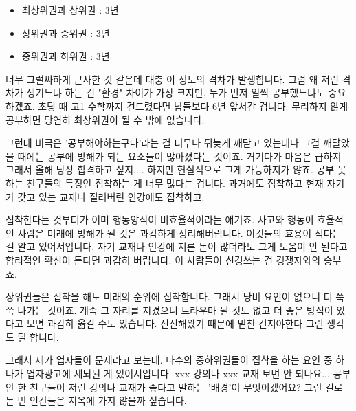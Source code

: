 \vspace{5mm}
\begin{itemize}
    \item 최상위권과 상위권 : 3년
    \item 상위권과  중위권 : 3년
    \item 중위권과  하위권 : 3년
\end{itemize}
\vspace{5mm}

너무 그럴싸하게 근사한 것 같은데 대충 이 정도의 격차가 발생합니다.
그럼 왜 저런 격차가 생기느냐 하는 건 "환경" 차이가 가장 크지만, 누가 먼저 일찍 공부했느냐도 중요하겠죠.
초딩 때 고1 수학까지 건드렸다면 남들보다 6년 앞서간 겁니다. 무리하지 않게 공부하면 당연히 최상위권이 될 수 밖에 없습니다.
\vspace{5mm}

그런데 비극은 '공부해야하는구나'라는 걸 너무나 뒤늦게 깨닫고 있는데다
그걸 깨달았을 때에는 공부에 방해가 되는 요소들이 많아졌다는 것이죠.
거기다가 마음은 급하지 그래서 올해 당장 합격하고 싶지.... 하지만 현실적으로 그게 가능하지가 않죠.
공부 못 하는 친구들의 특징인 집착하는 게 너무 많다는 겁니다.
과거에도 집착하고 현재 자기가 갖고 있는 교재나 질러버린 인강에도 집착하고.
\vspace{5mm}

집착한다는 것부터가 이미 행동양식이 비효율적이라는 얘기죠.
사고와 행동이 효율적인 사람은 미래에 방해가 될 것은 과감하게 정리해버립니다. 이것들의 효용이 적다는 걸 알고 있어서입니다.
자기 교재나 인강에 지른 돈이 많더라도 그게 도움이 안 된다고 합리적인 확신이 든다면 과감히 버립니다.
이 사람들이 신경쓰는 건 경쟁자와의 승부죠.
\vspace{5mm}

상위권들은 집착을 해도 미래의 순위에 집착합니다. 그래서 낭비 요인이 없으니 더 쭉쭉 나가는 것이죠.
계속 그 자리를 지켰으니 트라우마 될 것도 없고 더 좋은 방식이 있다고 보면 과감히 옮길 수도 있습니다.
전진해왔기 때문에 밑천 건져야한다 그런 생각도 덜 합니다.
\vspace{5mm}

그래서 제가 업자들이 문제라고 보는데. 다수의 중하위권들이 집착을 하는 요인 중 하나가 업자광고에 세뇌된 게 있어서입니다.
xxx 강의나 xxx 교재 보면 안 되나요... 공부 안 한 친구들이 저런 강의나 교재가 좋다고 말하는 '배경'이 무엇이겠어요?
그런 걸로 돈 번 인간들은 지옥에 가지 않을까 싶습니다.
\vspace{5mm}









